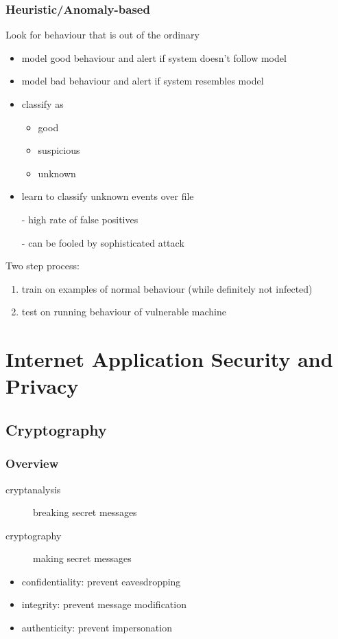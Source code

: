 \documentclass[]{article}
\theoremstyle{definition}
\begin{document}
	\subsubsection{Heuristic/Anomaly-based}
	Look for behaviour that is out of the ordinary
	\begin{itemize}
		\item model good behaviour and alert if system doesn't follow model
		\item model bad behaviour and alert if system resembles model
		\item classify as 
			\begin{itemize}
				\item good
				\item suspicious
				\item unknown
			\end{itemize}
		\item learn to classify unknown events over file
		\item[-] high rate of false positives
		\item[-] can be fooled by sophisticated attack
	\end{itemize}
	Two step process:
	\begin{enumerate}
		\item train on examples of normal behaviour (while definitely not infected)
		\item test on running behaviour of vulnerable machine
	\end{enumerate}


	\section{Internet Application Security and Privacy}
	\subsection{Cryptography}
	\subsubsection{Overview}
	\begin{description}
		\item[cryptanalysis] breaking secret messages
		\item[cryptography] making secret messages
	\end{description}
	\begin{itemize}
		\item confidentiality: prevent eavesdropping
		\item integrity: prevent message modification
		\item authenticity: prevent impersonation
	\end{itemize}
\end{document}
